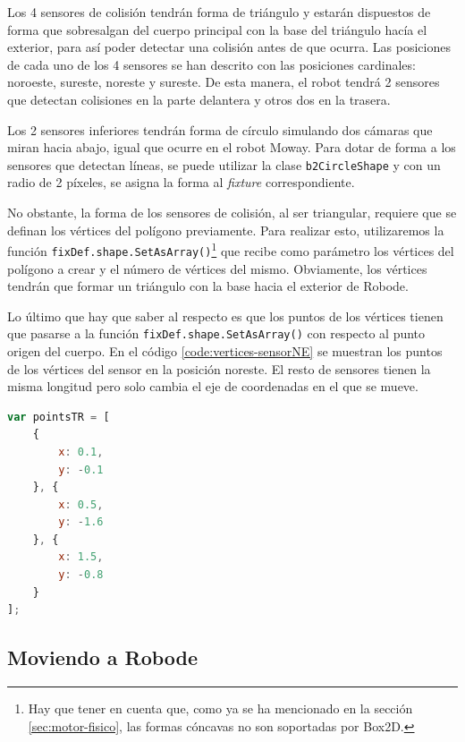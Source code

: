 Los 4 sensores de colisión tendrán forma de triángulo y estarán dispuestos de forma que sobresalgan del cuerpo principal con la base del triángulo hacía el exterior, para así poder detectar una colisión antes de que ocurra. Las posiciones de cada uno de los 4 sensores se han descrito con las posiciones cardinales: noroeste, sureste, noreste y sureste. De esta manera, el robot tendrá 2 sensores que detectan colisiones en la parte delantera y otros dos en la trasera. 

Los 2 sensores inferiores tendrán forma de círculo simulando dos cámaras que miran hacia abajo, igual que ocurre en el robot Moway. Para dotar de forma a los sensores que detectan líneas, se puede utilizar la clase \texttt{b2CircleShape} y con un radio de 2 píxeles, se asigna la forma al \emph{fixture} correspondiente.

No obstante, la forma de los sensores de colisión, al ser triangular, requiere que se definan los vértices del polígono previamente.  Para realizar esto, utilizaremos la función \texttt{fixDef.shape.SetAsArray()}\footnote{Hay que tener en cuenta que, como ya se ha mencionado en la sección \ref{sec:motor-fisico}, las formas cóncavas no son soportadas por Box2D.} que recibe como parámetro los vértices del polígono a crear y el número de vértices del mismo. Obviamente, los vértices tendrán que formar un triángulo con la base hacia el exterior de Robode.

Lo último que hay que saber al respecto es que los puntos de los vértices tienen que pasarse a la función \texttt{fixDef.shape.SetAsArray()} con respecto al punto origen del cuerpo. En el código \ref{code:vertices-sensorNE} se muestran los puntos de los vértices del sensor en la posición noreste. El resto de sensores tienen la misma longitud pero solo cambia el eje de coordenadas en el que se mueve.

\begin{lstlisting}[language={Javascript},label={code:vertices-sensorNE}, caption={Vértices que forman el triángulo del sensor noreste de Robode.}]
var pointsTR = [
	{
	    x: 0.1,
	    y: -0.1
	}, {
	    x: 0.5,
	    y: -1.6
	}, {
	    x: 1.5,
	    y: -0.8
	}
];
\end{lstlisting}



\subsection{Moviendo a Robode}
\label{moviendo-robode}



